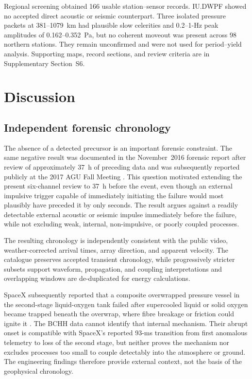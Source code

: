 \documentclass[]{seismica}
\begin{document}
Regional screening obtained 166 usable station--sensor records. IU.DWPF showed
no accepted direct acoustic or seismic counterpart. Three isolated pressure
packets at 381--1079~km had plausible slow celerities and 0.2--1-Hz peak
amplitudes of 0.162--0.352~Pa, but no coherent moveout was present across 98
northern stations. They remain unconfirmed and were not used for period--yield
analysis. Supporting maps, record sections, and review criteria are in
Supplementary Section~S6.

\FloatBarrier

\section{Discussion}
\label{sec:discussion}

\subsection{Independent forensic chronology}

The absence of a detected precursor is an important forensic constraint. The same negative result was documented in the
November~2016 forensic report after review of approximately 37~h of preceding
data \citep{thompson_mcnutt_fireball_2016} and was subsequently reported
publicly at the 2017 AGU Fall Meeting \citep{thompson_agu_falcon9_2017}.
This question motivated extending the present six-channel review to 37~h
before the event, even though an external impulsive
trigger capable of immediately initiating the failure would most plausibly
have preceded it by only seconds. The result argues against
a readily detectable external acoustic or seismic impulse immediately before
the failure, while not excluding weak, internal, non-impulsive, or poorly
coupled processes.

The resulting chronology is independently consistent with the public video,
weather-corrected arrival times, array direction, and apparent velocity. The
catalogue preserves accepted transient chronology, while progressively stricter
subsets support waveform, propagation, and coupling interpretations and
overlapping windows are de-duplicated for energy calculations.

SpaceX subsequently reported that a composite overwrapped pressure vessel in
the second-stage liquid-oxygen tank failed after supercooled liquid or solid
oxygen became trapped beneath the overwrap, where fibre breakage or friction
could ignite it \citep{spacex_anomaly_2017,nasa_sma_falcon9}. The BCHH data
cannot identify that internal mechanism. Their abrupt onset is compatible with
SpaceX's reported 93-ms transition from first anomalous telemetry to loss of
the second stage, but neither proves the mechanism nor excludes processes too
small to couple detectably into the atmosphere or ground. The engineering
findings therefore provide external context, not the basis of the geophysical
chronology.
\end{document}
